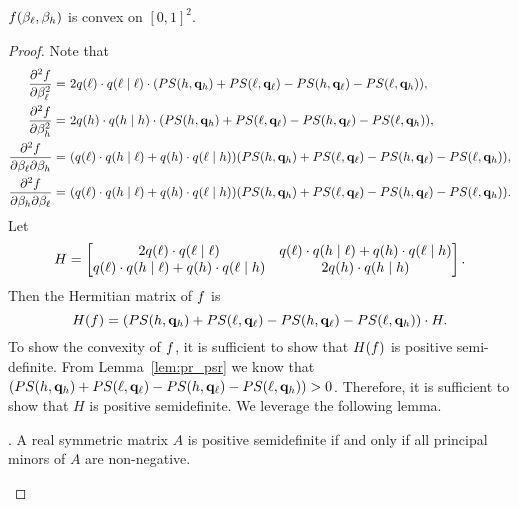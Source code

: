 \begin{claim}
\label{claim:fconvex}
   $f(\beta_{\ell}, \beta_{h})$ is convex on $[0, 1]^2$.  
\end{claim}

\begin{proof}
    Note that 
    \begin{align*}
        \frac{\partial^2 \func}{\partial\bpl^2} =&\ 2\pr(\ell) \cdot \pr(\ell \mid \ell) \cdot (\ps(h, \vpr_h) + \ps(\ell, \vpr_{\ell}) - \ps(h, \vpr_{\ell}) - \ps(\ell, \vpr_h)), \\
        \frac{\partial^2 \func}{\partial\bph^2} =&\ 2\pr(h) \cdot \pr(h \mid h) \cdot (\ps(h, \vpr_h) + \ps(\ell, \vpr_{\ell}) - \ps(h, \vpr_{\ell}) - \ps(\ell, \vpr_h)),\\
        \frac{\partial^2 \func}{\partial\bpl \partial\bph} =&\ (\pr(\ell) \cdot \pr(h \mid \ell) + \pr(h)\cdot \pr(\ell \mid h)) (\ps(h, \vpr_h) + \ps(\ell, \vpr_{\ell}) - \ps(h, \vpr_{\ell}) - \ps(\ell, \vpr_h)),\\
        \frac{\partial^2 \func}{\partial\bph \partial\bpl} =&\ (\pr(\ell) \cdot \pr(h \mid \ell) + \pr(h)\cdot \pr(\ell \mid h)) (\ps(h, \vpr_h) + \ps(\ell, \vpr_{\ell}) - \ps(h, \vpr_{\ell}) - \ps(\ell, \vpr_h)).
    \end{align*}
    Let \begin{equation*}
    H = 
        \begin{bmatrix}
            2q(\ell) \cdot q(\ell \mid \ell) & q(\ell) \cdot q(h \mid \ell) + q(h)\cdot q(\ell \mid h)\\
            q(\ell) \cdot q(h \mid \ell) + q(h)\cdot q(\ell \mid h) & 2q(h) \cdot q(h \mid h) 
        \end{bmatrix}. 
    \end{equation*}
        Then the Hermitian matrix of $f$ is 
    \begin{equation*}
        H(f) =  (PS(h, \mathbf{q}_h) + PS(\ell, \mathbf{q}_{\ell}) - PS(h, \mathbf{q}_{\ell}) - PS(\ell, \mathbf{q}_h)) \cdot H. 
    \end{equation*}
To show the convexity of $f$, it is sufficient to show that $H(f)$ is positive semi-definite. From Lemma~\ref{lem:pr_psr} we know that $(PS(h, \mathbf{q}_h) + PS(\ell, \mathbf{q}_{\ell}) - PS(h, \mathbf{q}_{\ell}) - PS(\ell, \mathbf{q}_h)) > 0$. Therefore, it is sufficient to show that $H$ is positive semidefinite. We leverage the following lemma. 

\begin{lemma}\cite[(7.6.12)]{Meyer2000:Matrix}.
    \label{lem:sylvester}
    A real symmetric matrix $A$ is positive semidefinite if and only if all principal minors of $A$ are non-negative. 
\end{lemma}


\end{proof}
